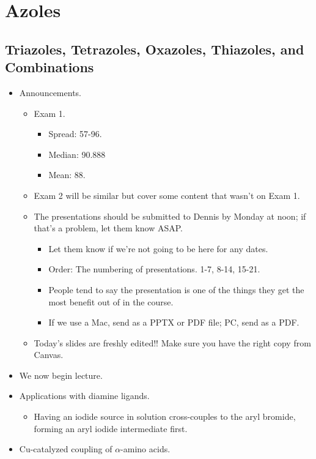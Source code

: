 \documentclass[../notes.tex]{subfiles}
\begin{document}
\chapter{Azoles}
\section{Triazoles, Tetrazoles, Oxazoles, Thiazoles, and Combinations}
\begin{itemize}
    \item {}Announcements.
    \begin{itemize}
        \item Exam 1.
        \begin{itemize}
            \item Spread: 57-96.
            \item Median: 90.888
            \item Mean: 88.
        \end{itemize}
        \item Exam 2 will be similar but cover some content that wasn't on Exam 1.
        \item The presentations should be submitted to Dennis by Monday at noon; if that's a problem, let them know ASAP.
        \begin{itemize}
            \item Let them know if we're not going to be here for any dates.
            \item Order: The numbering of presentations. 1-7, 8-14, 15-21.
            \item People tend to say the presentation is one of the things they get the most benefit out of in the course.
            \item If we use a Mac, send as a PPTX or PDF file; PC, send as a PDF.
        \end{itemize}
        \item Today's slides are freshly edited!! Make sure you have the right copy from Canvas.
    \end{itemize}
    \item We now begin lecture.
    \item Applications with diamine ligands.
    \begin{itemize}
        \item Having an iodide source in solution cross-couples  to the aryl bromide, forming an aryl iodide intermediate first.
    \end{itemize}
    \item Cu-catalyzed coupling of $\alpha$-amino acids.

\end{itemize}
\end{document}
